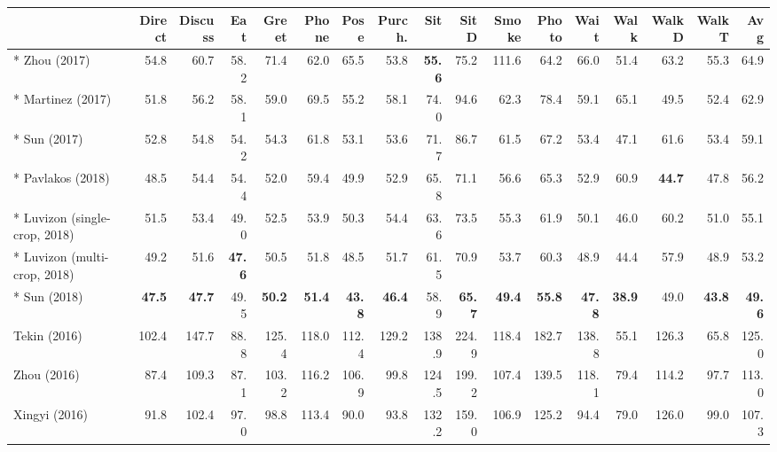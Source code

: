 \documentclass[10pt,twocolumn,letterpaper]{article}
\begin{document}
\setlength\tabcolsep{0.75mm}
\begin{table*}[t]
\footnotesize
\centering
\begin{tabular}{lrrrrrrrrrrrrrrr|r}
\hline
                               & Direct& Discuss&Eat  & Greet & Phone & Pose  & Purch.& Sit   & SitD  & Smoke & Photo & Wait  & Walk & WalkD &WalkT & Avg \\
\hline                                                                                                                
* Zhou (2017) \cite{Zhou17ICCV} & 54.8 & 60.7 & 58.2 & 71.4 & 62.0 & 65.5 & 53.8 & \textbf{55.6} & 75.2 & 111.6 & 64.2 & 66.0 & 51.4 & 63.2 & 55.3 & 64.9 \\
* Martinez (2017) \cite{Martinez17ICCV} & 51.8 & 56.2 & 58.1 & 59.0 & 69.5 & 55.2 & 58.1 & 74.0 & 94.6 & 62.3 & 78.4 & 59.1 & 65.1 & 49.5 & 52.4 & 62.9 \\
* Sun (2017) \cite{Sun17ICCV}           & 52.8 & 54.8 & 54.2 & 54.3 & 61.8 & 53.1 & 53.6 & 71.7 & 86.7 & 61.5 & 67.2 & 53.4 & 47.1 & 61.6 & 53.4 & 59.1 \\
* Pavlakos (2018) \cite{Pavlakos18CVPR} & 48.5 & 54.4 & 54.4 & 52.0 & 59.4 & 49.9 & 52.9 & 65.8 & 71.1 & 56.6 & 65.3 & 52.9 & 60.9 & \textbf{44.7} & 47.8 & 56.2 \\
* Luvizon (single-crop, 2018) \cite{Luvizon18CVPR} & 51.5 & 53.4 & 49.0 & 52.5 & 53.9 & 50.3 & 54.4 & 63.6 & 73.5 & 55.3 & 61.9 & 50.1 & 46.0 & 60.2 & 51.0 & 55.1 \\
* Luvizon (multi-crop, 2018) \cite{Luvizon18CVPR} & 49.2 & 51.6 & \textbf{47.6} & 50.5 & 51.8 & 48.5 & 51.7 & 61.5 & 70.9 & 53.7 & 60.3 & 48.9 & 44.4 & 57.9 & 48.9 & 53.2 \\
* Sun (2018) \cite{Sun18ECCV} & \textbf{47.5} & \textbf{47.7} & 49.5 & \textbf{50.2} & \textbf{51.4} & \textbf{43.8} & \textbf{46.4} & 58.9 & \textbf{65.7} & \textbf{49.4} & \textbf{55.8} & \textbf{47.8} & \textbf{38.9} & 49.0 & \textbf{43.8} & \textbf{49.6} \\
\hline
Tekin (2016) \cite{Tekin16CVPR}       & 102.4 & 147.7 & 88.8 & 125.4 & 118.0 & 112.4 & 129.2 & 138.9 & 224.9 & 118.4 & 182.7 & 138.8 & 55.1 & 126.3 & 65.8 & 125.0 \\
Zhou (2016) \cite{Zhou16CVPR}         & 87.4  & 109.3 & 87.1 & 103.2 & 116.2 & 106.9 & 99.8  & 124.5 & 199.2 & 107.4 & 139.5 & 118.1 & 79.4 & 114.2 & 97.7 & 113.0 \\
Xingyi (2016) \cite{Zhou16ECCV}       & 91.8  & 102.4 & 97.0 & 98.8  & 113.4 & 90.0  & 93.8  & 132.2 & 159.0 & 106.9 & 125.2 & 94.4  & 79.0 & 126.0 & 99.0 & 107.3 \\

\end{tabular}
\end{table*}
\end{document}
